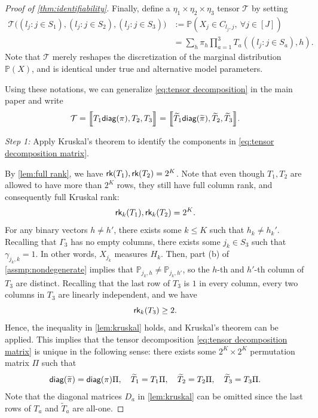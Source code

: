 \documentclass[10pt]{article} %
\newcommand{\PP}{\mathbb P}
\newcommand{\rk}{\textsf{\upshape rk}}
\newcommand{\diag}{\textsf{\upshape diag}}
\def\tilde{\widetilde}
\begin{document}
\begin{proof}[Proof of \cref{thm:identifiability}]
    Finally, define a $\eta_1 \times \eta_2 \times \eta_3$ tensor $\mathcal{T}$ by setting 
    \begin{align*}
        \mathcal{T}\Big((l_j: j \in S_1), (l_j: j \in S_2), (l_j: j \in S_3)\Big) &:= \PP(X_j \in C_{l_j, j}, ~ \forall j \in [J]) \\
        &= \sum_{h} \pi_h \prod_{a=1}^3 T_a((l_j: j \in S_a), h).
    \end{align*}
    Note that $\mathcal{T}$ merely reshapes the discretization of the marginal distribution $\PP(X)$, and is identical under true and alternative model parameters.
    
    Using these notations, we can generalize \eqref{eq:tensor decomposition} in the main paper and write
    \begin{align}\label{eq:tensor decomposition matrix}
        \mathcal{T} = \Big\llbracket T_1 \diag(\pi), T_2, T_3 \Big\rrbracket = \Big\llbracket \tilde{T}_1 \diag(\tilde{\pi}), \tilde{T}_2, \tilde{T}_3 \Big\rrbracket .
    \end{align}

    \emph{Step 1:} Apply Kruskal's theorem to identify the components in \eqref{eq:tensor decomposition matrix}.

    By \cref{lem:full rank}, we have $\rk(T_1), \rk(T_2) = 2^K$. Note that even though $T_1, T_2$ are allowed to have more than $2^K$ rows, they still have full column rank, and consequently full Kruskal rank:
    $$\rk_k(T_1), \rk_k(T_2) = 2^K.$$
    For any binary vectors $h \neq h'$, there exists some $k \le K$ such that $h_k \neq h_k'$. Recalling that $\Gamma_3$ has no empty columns, there exists some $j_k \in S_3$ such that $\gamma_{j_k, k} = 1$. In other words, $X_{j_k}$ measures $H_k$. Then, part (b) of \cref{assmp:nondegenerate} implies that $\PP_{j_k,h} \ne \PP_{j_k,h'}$, so the $h$-th and $h'$-th column of $T_3$ are distinct. Recalling that the last row of $T_3$ is $1$ in every column, every two columns in $T_3$ are linearly independent, and we have 
    $$\rk_k(T_3) \ge 2.$$
    Hence, the inequality in \cref{lem:kruskal} holds, and Kruskal's theorem can be applied. This implies that the tensor decomposition \eqref{eq:tensor decomposition matrix} is unique in the following sense: there exists some $2^K \times 2^K$ permutation matrix $\Pi$ such that 
    \begin{align}\label{eq:kruskal consequence}
        \diag(\tilde{\pi}) = \diag(\pi) \Pi, \quad \tilde{T}_1  = T_1 \Pi, \quad \tilde{T}_2= T_2 \Pi, \quad \tilde{T}_3 = T_3 \Pi.
    \end{align}
    Note that the diagonal matrices $D_a$ in \cref{lem:kruskal} can be omitted since the last rows of $T_a$ and $\tilde{T}_a$ are all-one. 


\end{proof}
\end{document}

